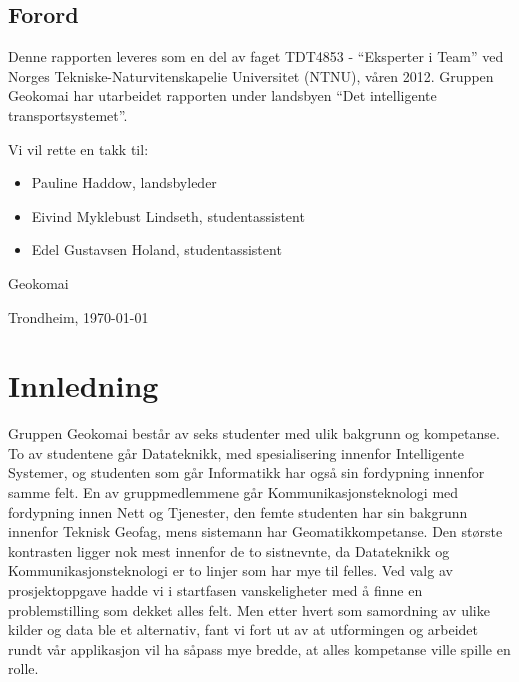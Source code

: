 \documentclass[a4paper,norsk,oneside]{book}
\newcommand{\thesisAuthor}{Geokomai}
\begin{document}



\clearpage

\section*{Forord}



\vspace{1cm}

Denne rapporten leveres som en del av faget TDT4853 - “Eksperter i Team” ved Norges Tekniske-Naturvitenskapelie Universitet (NTNU), våren 2012. Gruppen Geokomai har utarbeidet rapporten under landsbyen “Det intelligente transportsystemet”. 

Vi vil rette en takk til:
\begin{itemize}	
\item Pauline Haddow, landsbyleder
\item Eivind Myklebust Lindseth, studentassistent
\item Edel Gustavsen Holand, studentassistent
\end {itemize}




\vfill

\hfill \thesisAuthor

\hfill Trondheim, \today

\clearpage

\tableofcontents

\listoffigures

\listoftables

\mainmatter

\chapter{Innledning}
\label{cha:Introduction}
Gruppen Geokomai består av seks studenter med ulik bakgrunn og kompetanse. To av studentene går Datateknikk, med spesialisering innenfor Intelligente Systemer, og studenten som går Informatikk har også sin fordypning innenfor samme felt. En av gruppmedlemmene 
går Kommunikasjonsteknologi med fordypning innen Nett og Tjenester, den femte studenten har sin bakgrunn innenfor Teknisk Geofag, mens sistemann har Geomatikkompetanse. Den største kontrasten ligger nok mest innenfor de to sistnevnte, da Datateknikk og Kommunikasjonsteknologi er to linjer som har mye til felles. Ved valg av prosjektoppgave hadde vi i startfasen vanskeligheter med å finne en problemstilling som dekket alles felt. Men etter hvert som samordning av ulike kilder og data ble et alternativ, fant vi fort ut av at utformingen og arbeidet rundt vår applikasjon vil ha såpass mye bredde, at alles kompetanse ville spille en rolle.
\end{document}
